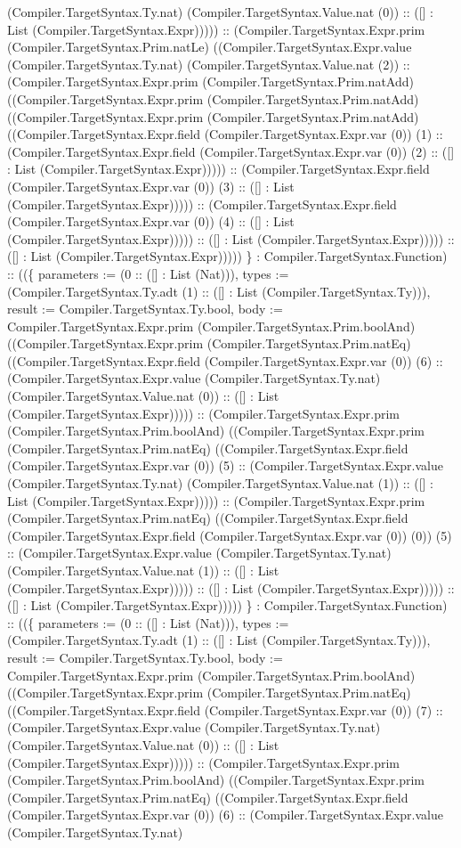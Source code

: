 \documentclass[11pt]{article}
\begin{document}
(Compiler.TargetSyntax.Ty.nat) (Compiler.TargetSyntax.Value.nat (0)) :: ([] : List (Compiler.TargetSyntax.Expr))))) :: (Compiler.TargetSyntax.Expr.prim (Compiler.TargetSyntax.Prim.natLe) ((Compiler.TargetSyntax.Expr.value (Compiler.TargetSyntax.Ty.nat) (Compiler.TargetSyntax.Value.nat (2)) :: (Compiler.TargetSyntax.Expr.prim (Compiler.TargetSyntax.Prim.natAdd) ((Compiler.TargetSyntax.Expr.prim (Compiler.TargetSyntax.Prim.natAdd) ((Compiler.TargetSyntax.Expr.prim (Compiler.TargetSyntax.Prim.natAdd) ((Compiler.TargetSyntax.Expr.field (Compiler.TargetSyntax.Expr.var (0)) (1) :: (Compiler.TargetSyntax.Expr.field (Compiler.TargetSyntax.Expr.var (0)) (2) :: ([] : List (Compiler.TargetSyntax.Expr))))) :: (Compiler.TargetSyntax.Expr.field (Compiler.TargetSyntax.Expr.var (0)) (3) :: ([] : List (Compiler.TargetSyntax.Expr))))) :: (Compiler.TargetSyntax.Expr.field (Compiler.TargetSyntax.Expr.var (0)) (4) :: ([] : List (Compiler.TargetSyntax.Expr))))) :: ([] : List (Compiler.TargetSyntax.Expr))))) :: ([] : List (Compiler.TargetSyntax.Expr))))) \} : Compiler.TargetSyntax.Function) :: ((\{ parameters := (0 :: ([] : List (Nat))), types := (Compiler.TargetSyntax.Ty.adt (1) :: ([] : List (Compiler.TargetSyntax.Ty))), result := Compiler.TargetSyntax.Ty.bool, body := Compiler.TargetSyntax.Expr.prim (Compiler.TargetSyntax.Prim.boolAnd) ((Compiler.TargetSyntax.Expr.prim (Compiler.TargetSyntax.Prim.natEq) ((Compiler.TargetSyntax.Expr.field (Compiler.TargetSyntax.Expr.var (0)) (6) :: (Compiler.TargetSyntax.Expr.value (Compiler.TargetSyntax.Ty.nat) (Compiler.TargetSyntax.Value.nat (0)) :: ([] : List (Compiler.TargetSyntax.Expr))))) :: (Compiler.TargetSyntax.Expr.prim (Compiler.TargetSyntax.Prim.boolAnd) ((Compiler.TargetSyntax.Expr.prim (Compiler.TargetSyntax.Prim.natEq) ((Compiler.TargetSyntax.Expr.field (Compiler.TargetSyntax.Expr.var (0)) (5) :: (Compiler.TargetSyntax.Expr.value (Compiler.TargetSyntax.Ty.nat) (Compiler.TargetSyntax.Value.nat (1)) :: ([] : List (Compiler.TargetSyntax.Expr))))) :: (Compiler.TargetSyntax.Expr.prim (Compiler.TargetSyntax.Prim.natEq) ((Compiler.TargetSyntax.Expr.field (Compiler.TargetSyntax.Expr.field (Compiler.TargetSyntax.Expr.var (0)) (0)) (5) :: (Compiler.TargetSyntax.Expr.value (Compiler.TargetSyntax.Ty.nat) (Compiler.TargetSyntax.Value.nat (1)) :: ([] : List (Compiler.TargetSyntax.Expr))))) :: ([] : List (Compiler.TargetSyntax.Expr))))) :: ([] : List (Compiler.TargetSyntax.Expr))))) \} : Compiler.TargetSyntax.Function) :: ((\{ parameters := (0 :: ([] : List (Nat))), types := (Compiler.TargetSyntax.Ty.adt (1) :: ([] : List (Compiler.TargetSyntax.Ty))), result := Compiler.TargetSyntax.Ty.bool, body := Compiler.TargetSyntax.Expr.prim (Compiler.TargetSyntax.Prim.boolAnd) ((Compiler.TargetSyntax.Expr.prim (Compiler.TargetSyntax.Prim.natEq) ((Compiler.TargetSyntax.Expr.field (Compiler.TargetSyntax.Expr.var (0)) (7) :: (Compiler.TargetSyntax.Expr.value (Compiler.TargetSyntax.Ty.nat) (Compiler.TargetSyntax.Value.nat (0)) :: ([] : List (Compiler.TargetSyntax.Expr))))) :: (Compiler.TargetSyntax.Expr.prim (Compiler.TargetSyntax.Prim.boolAnd) ((Compiler.TargetSyntax.Expr.prim (Compiler.TargetSyntax.Prim.natEq) ((Compiler.TargetSyntax.Expr.field (Compiler.TargetSyntax.Expr.var (0)) (6) :: (Compiler.TargetSyntax.Expr.value (Compiler.TargetSyntax.Ty.nat) 
\end{document}
